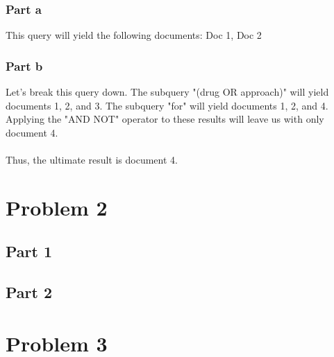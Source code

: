 \documentclass{article}%
\begin{document}
\subsubsection*{Part a}

This query will yield the following documents: Doc 1, Doc 2

\subsubsection*{Part b}

Let's break this query down. The subquery "(drug OR approach)" will yield documents 1, 2, and 3. The subquery "for" will yield documents 1, 2, and 4. Applying the "AND NOT" operator to these results will leave us with only document 4.\\
\\
Thus, the ultimate result is document 4.

\section*{Problem 2}
\subsection*{Part 1}
\subsection*{Part 2}
\section*{Problem 3}
\end{document}
